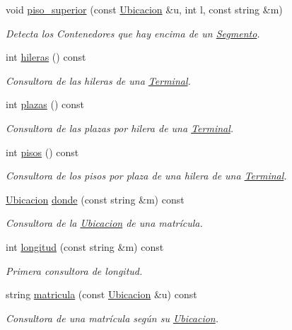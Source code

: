 \begin{DoxyCompactItemize}
void \hyperlink{class_terminal_aeadd54221b7138f6b1b4e7d072723ffa}{piso\+\_\+superior} (const \hyperlink{class_ubicacion}{Ubicacion} \&u, int l, const string \&m)
\begin{DoxyCompactList}\small\item\em Detecta los Contenedores que hay encima de un \hyperlink{class_segmento}{Segmento}. \end{DoxyCompactList}\item 
int \hyperlink{class_terminal_a6e7268ad5b0ffbf1484f1f1522e800f0}{hileras} () const
\begin{DoxyCompactList}\small\item\em Consultora de las hileras de una \hyperlink{class_terminal}{Terminal}. \end{DoxyCompactList}\item 
int \hyperlink{class_terminal_a06602e79ec9e7bca40d73d7a6c436fe3}{plazas} () const
\begin{DoxyCompactList}\small\item\em Consultora de las plazas por hilera de una \hyperlink{class_terminal}{Terminal}. \end{DoxyCompactList}\item 
int \hyperlink{class_terminal_ae6e79d13bb240d038142256552ae0ec9}{pisos} () const
\begin{DoxyCompactList}\small\item\em Consultora de los pisos por plaza de una hilera de una \hyperlink{class_terminal}{Terminal}. \end{DoxyCompactList}\item 
\hyperlink{class_ubicacion}{Ubicacion} \hyperlink{class_terminal_a2847cb58fe61bb488f089bc67a1973fe}{donde} (const string \&m) const
\begin{DoxyCompactList}\small\item\em Consultora de la \hyperlink{class_ubicacion}{Ubicacion} de una matrícula. \end{DoxyCompactList}\item 
int \hyperlink{class_terminal_afc6d0f22bcc642c6ac4355e0b02a7d79}{longitud} (const string \&m) const
\begin{DoxyCompactList}\small\item\em Primera consultora de longitud. \end{DoxyCompactList}\item 
string \hyperlink{class_terminal_a674811a7b56f57ff5b447d10565e923b}{matricula} (const \hyperlink{class_ubicacion}{Ubicacion} \&u) const
\begin{DoxyCompactList}\small\item\em Consultora de una matrícula según su \hyperlink{class_ubicacion}{Ubicacion}. \end{DoxyCompactList}\item 

\end{DoxyCompactItemize}
